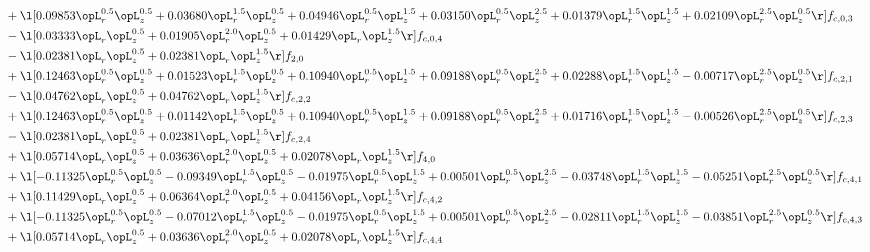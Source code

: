 \begin{alignat}{2}
& + \l[  0.09853 \opL_r^{0.5} \opL_z^{0.5} +  0.03680 \opL_r^{1.5} \opL_z^{0.5} +  0.04946 \opL_r^{0.5} \opL_z^{1.5} +  0.03150 \opL_r^{0.5} \opL_z^{2.5} +  0.01379 \opL_r^{1.5} \opL_z^{1.5} +  0.02109 \opL_r^{2.5} \opL_z^{0.5}  \r] f_{c,0,3} \nonumber \\ 
& - \l[  0.03333 \opL_r \opL_z^{0.5} +  0.01905 \opL_r^{2.0} \opL_z^{0.5} +  0.01429 \opL_r \opL_z^{1.5}  \r] f_{c,0,4} \nonumber \\ 
& - \l[  0.02381 \opL_r \opL_z^{0.5} +  0.02381 \opL_r \opL_z^{1.5}  \r] f_{2,0} \nonumber \\ 
& + \l[  0.12463 \opL_r^{0.5} \opL_z^{0.5} +  0.01523 \opL_r^{1.5} \opL_z^{0.5} +  0.10940 \opL_r^{0.5} \opL_z^{1.5} +  0.09188 \opL_r^{0.5} \opL_z^{2.5} +  0.02288 \opL_r^{1.5} \opL_z^{1.5}   -0.00717 \opL_r^{2.5} \opL_z^{0.5}  \r] f_{c,2,1} \nonumber \\ 
& - \l[  0.04762 \opL_r \opL_z^{0.5} +  0.04762 \opL_r \opL_z^{1.5}  \r] f_{c,2,2} \nonumber \\ 
& + \l[  0.12463 \opL_r^{0.5} \opL_z^{0.5} +  0.01142 \opL_r^{1.5} \opL_z^{0.5} +  0.10940 \opL_r^{0.5} \opL_z^{1.5} +  0.09188 \opL_r^{0.5} \opL_z^{2.5} +  0.01716 \opL_r^{1.5} \opL_z^{1.5}   -0.00526 \opL_r^{2.5} \opL_z^{0.5}  \r] f_{c,2,3} \nonumber \\ 
& - \l[  0.02381 \opL_r \opL_z^{0.5} +  0.02381 \opL_r \opL_z^{1.5}  \r] f_{c,2,4} \nonumber \\ 
& + \l[  0.05714 \opL_r \opL_z^{0.5} +  0.03636 \opL_r^{2.0} \opL_z^{0.5} +  0.02078 \opL_r \opL_z^{1.5}  \r] f_{4,0} \nonumber \\ 
& + \l[  -0.11325 \opL_r^{0.5} \opL_z^{0.5}   -0.09349 \opL_r^{1.5} \opL_z^{0.5}   -0.01975 \opL_r^{0.5} \opL_z^{1.5} +  0.00501 \opL_r^{0.5} \opL_z^{2.5}   -0.03748 \opL_r^{1.5} \opL_z^{1.5}   -0.05251 \opL_r^{2.5} \opL_z^{0.5}  \r] f_{c,4,1} \nonumber \\ 
& + \l[  0.11429 \opL_r \opL_z^{0.5} +  0.06364 \opL_r^{2.0} \opL_z^{0.5} +  0.04156 \opL_r \opL_z^{1.5}  \r] f_{c,4,2} \nonumber \\ 
& + \l[  -0.11325 \opL_r^{0.5} \opL_z^{0.5}   -0.07012 \opL_r^{1.5} \opL_z^{0.5}   -0.01975 \opL_r^{0.5} \opL_z^{1.5} +  0.00501 \opL_r^{0.5} \opL_z^{2.5}   -0.02811 \opL_r^{1.5} \opL_z^{1.5}   -0.03851 \opL_r^{2.5} \opL_z^{0.5}  \r] f_{c,4,3} \nonumber \\ 
& + \l[  0.05714 \opL_r \opL_z^{0.5} +  0.03636 \opL_r^{2.0} \opL_z^{0.5} +  0.02078 \opL_r \opL_z^{1.5}  \r] f_{c,4,4} \nonumber \\ 
\end{alignat} 



